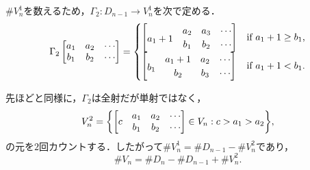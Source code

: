 \documentclass[xelatex,ja=standard,a4paper,14pt,everyparhook=compat]{bxjsarticle}
\newcommand{\up}[1]{\smash{\raisebox{.5\normalbaselineskip}{$#1$}}}
\theoremstyle{definition}
\begin{document}
$\#V_n^1$を数えるため，$\Gamma_2 : D_{n-1} \to V_n^1$を次で定める． \begin{equation*}
    \Gamma_2 \begin{bmatrix}
        a_1 & a_2 & \cdots \\
        b_1 & b_2 & \cdots
    \end{bmatrix} = \begin{cases}
        \begin{bmatrix}
                         & a_2 & a_3 & \cdots \\
            \up{a_1 + 1} & b_1 & b_2 & \cdots
        \end{bmatrix} & \text{if $a_1 + 1 \geq b_1$,} \\
        \begin{bmatrix}
                     & a_1 + 1 & a_2 & \cdots \\
            \up{b_1} & b_2     & b_3 & \cdots
        \end{bmatrix} & \text{if $a_1 + 1 < b_1$.}    \\
    \end{cases}
\end{equation*}

\newpage

先ほどと同様に，$\Gamma_2$は全射だが単射ではなく， \begin{equation*}
    V_n^2 = \mleft\{ \begin{bmatrix}
               & a_1 & a_2 & \cdots \\
        \up{c} & b_1 & b_2 & \cdots
    \end{bmatrix} \in V_n : c > a_1 > a_2 \mright\},
\end{equation*}
の元を$2$回カウントする．したがって$\#V_n^1 = \#D_{n-1} - \#V_n^2$であり， \begin{equation*}
    \#V_n = \#D_n - \#D_{n-1} + \#V_n^2.
\end{equation*}
\end{document}
